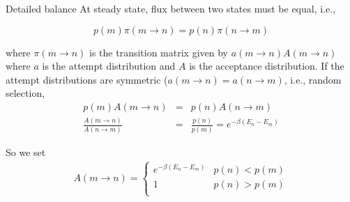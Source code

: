 \documentclass[aspectratio=169]{beamer}
\begin{document}
\begin{frame}{Detailed balance}
At steady state, flux between two states must be equal, i.e.,

\begin{equation*}
p(m) \pi(m \rightarrow n) = p(n) \pi(n \rightarrow m)
\end{equation*} 

where $\pi(m \rightarrow n)$ is the transition matrix given by $a(m \rightarrow n)A(m \rightarrow n)$ where $a$ is the attempt distribution and $A$ is the acceptance distribution. If the attempt distributions are symmetric ($a(m \rightarrow n) = a(n \rightarrow m)$, i.e., random selection,
\begin{eqnarray*}
p(m) A(m \rightarrow n) & = & p(n) A(n \rightarrow m)\\
\frac{A(m \rightarrow n)}{A(n \rightarrow m)} & = & \frac{p(n)}{p(m)} = e^{-\beta (E_n - E_m)}
\end{eqnarray*} 

So we set 
\begin{eqnarray*}
A(m \rightarrow n) = \begin{cases}
e^{-\beta (E_n - E_m)} &p(n) < p(m)\\
1 & p(n) > p(m)\\
  \end{cases}
\end{eqnarray*} 

\end{frame} 
\end{document}
